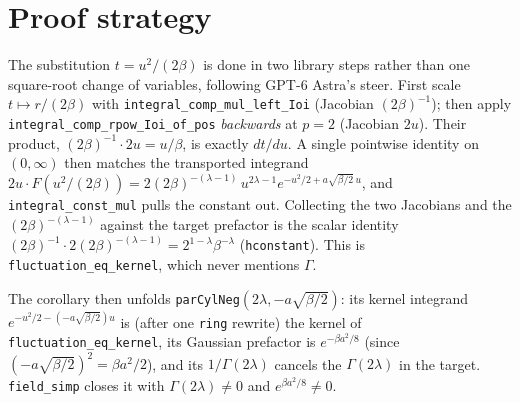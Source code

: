 \documentclass[11pt]{article}
\begin{document}
\section{Proof strategy}
The substitution $t=u^2/(2\beta)$ is done in two library steps rather than one square-root change of
variables, following GPT-6 Astra's steer. First scale $t\mapsto r/(2\beta)$ with
\texttt{integral\_comp\_mul\_left\_Ioi} (Jacobian $(2\beta)^{-1}$); then apply
\texttt{integral\_comp\_rpow\_Ioi\_of\_pos} \emph{backwards} at $p=2$ (Jacobian $2u$). Their product,
$(2\beta)^{-1}\cdot 2u=u/\beta$, is exactly $dt/du$. A single pointwise identity on $(0,\infty)$ then
matches the transported integrand
$2u\cdot F(u^2/(2\beta))=2(2\beta)^{-(\lambda-1)}\,u^{2\lambda-1}e^{-u^2/2+a\sqrt{\beta/2}\,u}$,
and \texttt{integral\_const\_mul} pulls the constant out. Collecting the two Jacobians and the
$(2\beta)^{-(\lambda-1)}$ against the target prefactor is the scalar identity
$(2\beta)^{-1}\!\cdot 2(2\beta)^{-(\lambda-1)}=2^{1-\lambda}\beta^{-\lambda}$
(\texttt{hconstant}). This is \texttt{fluctuation\_eq\_kernel}, which never mentions $\Gamma$.

The corollary then unfolds \texttt{parCylNeg}$(2\lambda,-a\sqrt{\beta/2})$: its kernel integrand
$e^{-u^2/2-(-a\sqrt{\beta/2})u}$ is (after one \texttt{ring} rewrite) the kernel of
\texttt{fluctuation\_eq\_kernel}, its Gaussian prefactor is $e^{-\beta a^2/8}$ (since
$(-a\sqrt{\beta/2})^2=\beta a^2/2$), and its $1/\Gamma(2\lambda)$ cancels the $\Gamma(2\lambda)$ in the
target. \texttt{field\_simp} closes it with $\Gamma(2\lambda)\ne0$ and $e^{\beta a^2/8}\ne0$.
\end{document}

